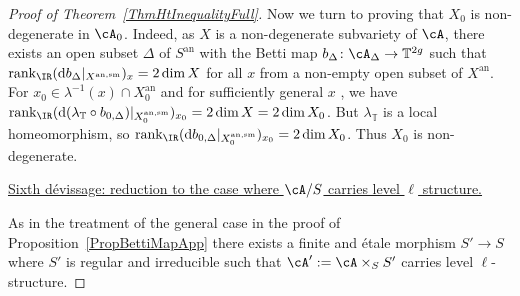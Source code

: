 \begin{proof}[Proof of Theorem~\ref{ThmHtInequalityFull}]
Now we turn to proving that $X_0$ is non-degenerate in $\cA_0$. Indeed, as $X$ is a non-degenerate subvariety of $\cA$, there exists an open subset $\Delta$ of $S^{\mathrm{an}}$ with the Betti map $b_{\Delta} \colon \cA_{\Delta} \rightarrow \mathbb{T}^{2g}$ such that $\mathrm{rank}_{\IR}(\mathrm{d}b_{\Delta}|_{X^{\mathrm{an,sm}}})_x = 2 \dim X$ for all $x$ from a non-empty open subset of $X^{\mathrm{an}}$. For $x_0 \in  \lambda^{-1}(x)\cap X_0^{\mathrm{an}}$
 and for sufficiently general $x$%
, we have
$\mathrm{rank}_{\IR}(\mathrm{d}(\lambda_{\mathbb{T}}\circ b_{0,\Delta})|_{X_0^{\mathrm{an,sm}}})_{x_0} = 2 \dim X = 2 \dim X_0$. But $\lambda_{\mathbb{T}}$ is a local homeomorphism, so $\mathrm{rank}_{\IR}(\mathrm{d} b_{0,\Delta}|_{X_0^{\mathrm{an,sm}}})_{x_0} = 2 \dim X_0$. Thus $X_0$ is non-degenerate.





\ul{Sixth d\'{e}vissage: reduction to the case where $\cA/S$
  carries level $\ell$ structure.}

As in the treatment of the general case in the proof of
Proposition~\ref{PropBettiMapApp}
there exists a finite and \'etale morphism $S'\rightarrow S$ where
$S'$ is regular and irreducible
 such that $\cA' := \cA\times_S S'$ carries level $\ell$-structure.



\end{proof}
